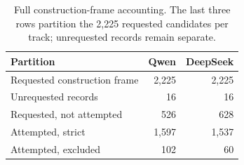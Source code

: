 \begin{table}[t]
\centering\small
\caption{Full construction-frame accounting. The last three rows partition the 2,225 requested candidates per track; unrequested records remain separate.}
\label{tab:frame}
\setlength{\tabcolsep}{4pt}
\begin{tabular}{@{}lrr@{}}
\toprule
Partition & Qwen & DeepSeek\\
\midrule
Requested construction frame & 2,225 & 2,225\\
Unrequested records & 16 & 16\\
Requested, not attempted & 526 & 628\\
Attempted, strict & 1,597 & 1,537\\
Attempted, excluded & 102 & 60\\
\bottomrule
\end{tabular}
\end{table}

